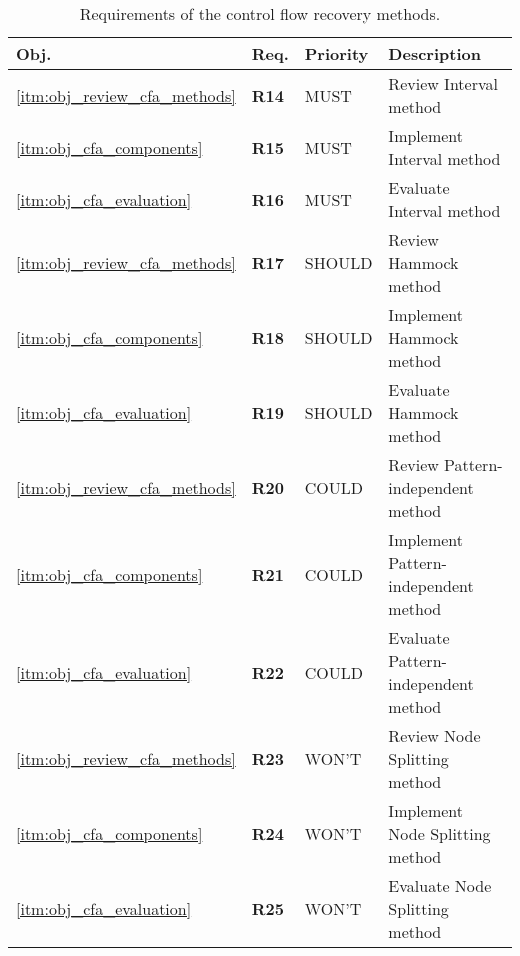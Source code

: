 \begin{table}[htbp]
	\begin{center}
		\begin{tabular}{|l|l|l|l|}
			\hline
			Obj. & Req. & Priority & Description \\
			\hline
			\ref{itm:obj_review_cfa_methods} & \textbf{R14} & MUST & Review Interval method \\
			\ref{itm:obj_cfa_components} & \textbf{R15} & MUST & Implement Interval method \\
			\ref{itm:obj_cfa_evaluation} & \textbf{R16} & MUST & Evaluate Interval method \\
			\hline
			\ref{itm:obj_review_cfa_methods} & \textbf{R17} & SHOULD & Review Hammock method \\
			\ref{itm:obj_cfa_components} & \textbf{R18} & SHOULD & Implement Hammock method \\
			\ref{itm:obj_cfa_evaluation} & \textbf{R19} & SHOULD & Evaluate Hammock method \\
			\hline
			\ref{itm:obj_review_cfa_methods} & \textbf{R20} & COULD & Review Pattern-independent method \\
			\ref{itm:obj_cfa_components} & \textbf{R21} & COULD & Implement Pattern-independent method \\
			\ref{itm:obj_cfa_evaluation} & \textbf{R22} & COULD & Evaluate Pattern-independent method \\
			\hline
			\ref{itm:obj_review_cfa_methods} & \textbf{R23} & WON'T & Review Node Splitting method \\
			\ref{itm:obj_cfa_components} & \textbf{R24} & WON'T & Implement Node Splitting method \\
			\ref{itm:obj_cfa_evaluation} & \textbf{R25} & WON'T & Evaluate Node Splitting method \\
			\hline
		\end{tabular}
	\end{center}
	\caption{Requirements of the control flow recovery methods.}
\end{table}
